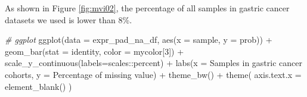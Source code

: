 \documentclass[
  12pt,
]{book}
\newenvironment{Shaded}{\begin{snugshade}}{\end{snugshade}}
\newcommand{\AttributeTok}[1]{\textcolor[rgb]{0.77,0.63,0.00}{#1}}
\newcommand{\CommentTok}[1]{\textcolor[rgb]{0.56,0.35,0.01}{\textit{#1}}}
\newcommand{\ControlFlowTok}[1]{\textcolor[rgb]{0.13,0.29,0.53}{\textbf{#1}}}
\newcommand{\DecValTok}[1]{\textcolor[rgb]{0.00,0.00,0.81}{#1}}
\newcommand{\FunctionTok}[1]{\textcolor[rgb]{0.00,0.00,0.00}{#1}}
\newcommand{\NormalTok}[1]{#1}
\newcommand{\OtherTok}[1]{\textcolor[rgb]{0.56,0.35,0.01}{#1}}
\newcommand{\SpecialCharTok}[1]{\textcolor[rgb]{0.00,0.00,0.00}{#1}}
\newcommand{\StringTok}[1]{\textcolor[rgb]{0.31,0.60,0.02}{#1}}
\begin{document}
\begin{Shaded}
\end{Shaded}

As shown in Figure \ref{fig:mvi02}, the percentage of all samples in gastric cancer datasets we used is lower than 8\%.

\begin{Shaded}
\begin{Highlighting}[]
\CommentTok{\# ggplot}
\FunctionTok{ggplot}\NormalTok{(}\AttributeTok{data =}\NormalTok{ expr\_pad\_na\_df, }
       \FunctionTok{aes}\NormalTok{(}\AttributeTok{x =}\NormalTok{ sample, }\AttributeTok{y =}\NormalTok{ prob)) }\SpecialCharTok{+} 
  \FunctionTok{geom\_bar}\NormalTok{(}\AttributeTok{stat =} \StringTok{\textquotesingle{}identity\textquotesingle{}}\NormalTok{, }\AttributeTok{color =}\NormalTok{ mycolor[}\DecValTok{3}\NormalTok{]) }\SpecialCharTok{+} 
  \FunctionTok{scale\_y\_continuous}\NormalTok{(}\AttributeTok{labels=}\NormalTok{scales}\SpecialCharTok{::}\NormalTok{percent) }\SpecialCharTok{+} 
  \FunctionTok{labs}\NormalTok{(}\AttributeTok{x =} \StringTok{\textquotesingle{}Samples in gastric cancer cohorts\textquotesingle{}}\NormalTok{, }
       \AttributeTok{y =} \StringTok{\textquotesingle{}Percentage of missing value\textquotesingle{}}\NormalTok{) }\SpecialCharTok{+} 
  \FunctionTok{theme\_bw}\NormalTok{() }\SpecialCharTok{+} 
  \FunctionTok{theme}\NormalTok{(}
    \AttributeTok{axis.text.x =} \FunctionTok{element\_blank}\NormalTok{()}
\NormalTok{  )}
\end{Highlighting}
\end{Shaded}
\end{document}

